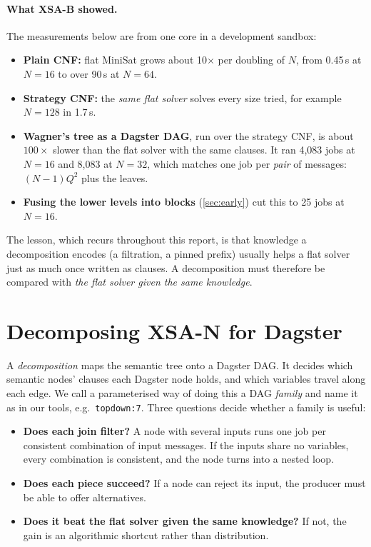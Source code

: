 \documentclass[11pt,a4paper]{article}
\newcommand{\XSA}{\textsf{XSA-N}}
\newcommand{\XSAB}{\textsf{XSA-B}}
\newcommand{\dfam}[1]{\texttt{#1}}
\begin{document}
\paragraph{What \XSAB{} showed.}
The measurements below are from one core in a development sandbox:
\begin{itemize}
\item \textbf{Plain CNF:} flat MiniSat grows about 10$\times$ per doubling of $N$, from
      0.45\,s at $N=16$ to over 90\,s at $N=64$.
\item \textbf{Strategy CNF:} the \emph{same flat solver} solves every size tried, for
      example $N=128$ in 1.7\,s.
\item \textbf{Wagner's tree as a Dagster DAG}, run over the strategy CNF, is about
      $100\times$ slower than the flat solver with the same clauses. It ran 4{,}083 jobs at
      $N=16$ and 8{,}083 at $N=32$, which matches one job per \emph{pair} of messages:
      $(N-1)Q^2$ plus the leaves.
\item \textbf{Fusing the lower levels into blocks} (\cref{sec:early}) cut this to 25 jobs at
      $N=16$.
\end{itemize}
The lesson, which recurs throughout this report, is that knowledge a decomposition encodes
(a filtration, a pinned prefix) usually helps a flat solver just as much once written as
clauses. A decomposition must therefore be compared with \emph{the flat solver given the
same knowledge}.

\section{Decomposing \XSA{} for Dagster}
\label{sec:families}

A \emph{decomposition} maps the semantic tree onto a Dagster DAG. It decides which semantic
nodes' clauses each Dagster node holds, and which variables travel along each edge. We call
a parameterised way of doing this a DAG \emph{family} and name it as in our tools, e.g.\
\dfam{topdown:7}. Three questions decide whether a family is useful:
\begin{itemize}
\item \textbf{Does each join filter?} A node with several inputs runs one job per
      consistent combination of input messages. If the inputs share no variables, every
      combination is consistent, and the node turns into a nested loop.
\item \textbf{Does each piece succeed?} If a node can reject its input, the producer must be
      able to offer alternatives.
\item \textbf{Does it beat the flat solver given the same knowledge?} If not, the gain is an
      algorithmic shortcut rather than distribution.
\end{itemize}
\end{document}
